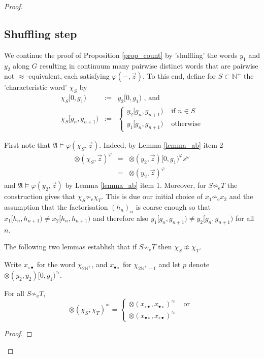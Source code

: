 \documentclass{stacs_proc}
\newcommand{\Nat}{\mathbb{N}}
\newcommand{\eqe}{\sim_{\textrm{e}}}
\newcommand{\frakA}{\mathfrak{A}}
\begin{document}
\begin{proof}
\vskip-0.3cm
\subsection{Shuffling step}

We continue the proof of Proposition \ref{prop_count} by 'shuffling' the
words $y_1$ and $y_2$ along $G$ resulting in continuum many pairwise distinct
words that are pairwise not $\approx$-equivalent, each satisfying
$\varphi(-,\vec{z})$.
To this end, define for $S \subset \Nat^+$ the 'characteristic word' $\chi_S$ by 
\begin{eqnarray*}
\chi_S[0,g_1) & := &y_2[0,g_1) \text{ , and }\\
\chi_S[g_n,g_{n+1}) & := &
\begin{cases} 	
		y_2[g_n,g_{n+1}) & \text{ if } n \in S \\
		y_1[g_n,g_{n+1}) & \text{ otherwise}
\end{cases}
\end{eqnarray*}

First note that $\frakA \models \varphi(\chi_S,\vec{z})$. 
Indeed, by Lemma \ref{lemma_ab} item 2
\begin{eqnarray*}
\otimes(\chi_S,\vec{z})^\varphi 	& = & \otimes(y_2,\vec{z})[0,g_1)^\varphi s^\omega\\
				& = & \otimes(y_2,\vec{z})^\varphi 
\end{eqnarray*}
and $\frakA \models \varphi(y_2,\vec{z})$ by Lemma \ref{lemma_ab} item 1. 
Moreover, for $S \not \eqe T$ the construction gives that $\chi_S \not \eqe \chi_T$.
This is due our initial choice of $x_1 \not \eqe x_2$ and the assumption that
the factorisation $(h_n)_n$ is coarse enough so that $x_1[h_n,h_{n+1}) \neq x_2[h_n,h_{n+1})$
and therefore also $y_1[g_n,g_{n+1}) \neq y_2[g_n,g_{n+1})$ for all $n$.

The following two lemmas establish that if $S \not \eqe T$ 
then $\chi_S \not \approx \chi_T$. 

Write $x_{\circ\bullet}$ for the word $\chi_{2\Nat^+}$, and $x_{\bullet\circ}$ for $\chi_{2\Nat^+ -1}$
and let $p$ denote $\otimes(y_2,y_2)[0,g_1)^\approx$.

\begin{lemma} \label{lemma_shuffle}
For all $S \not \eqe T$, 
\[
\otimes(\chi_S,\chi_T)^\approx= 
\begin{cases}
\otimes(x_{\circ\bullet},x_{\bullet\circ})^\approx & \text{ or }\\
\otimes(x_{\bullet\circ},x_{\circ\bullet})^\approx
\end{cases}
\]
\end{lemma}
\begin{proof}


\end{proof}
\end{proof}
\end{document}
